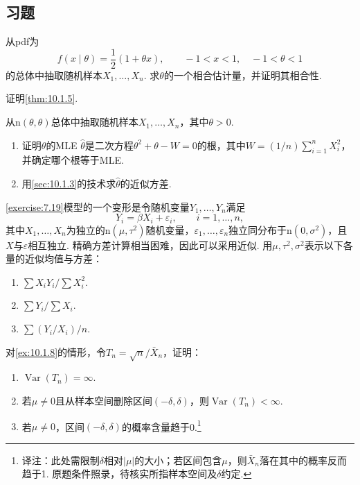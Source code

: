 \subsection{习题}\label{sec:10.5}

\begin{exercise}\label{exercise:10.1}
从pdf为
$$f(x\mid\theta)=\frac12(1+\theta x),\qquad-1<x<1,\quad-1<\theta<1$$
的总体中抽取随机样本$X_1,\ldots,X_n$. 求$\theta$的一个相合估计量，并证明其相合性.
\end{exercise}

\begin{exercise}\label{exercise:10.2}
证明\autoref{thm:10.1.5}.
\end{exercise}

\begin{exercise}\label{exercise:10.3}
从$\mathrm n(\theta,\theta)$总体中抽取随机样本$X_1,\ldots,X_n$，其中$\theta>0$.
\begin{enumerate}[label=(\alph*)]
\item 证明$\theta$的MLE $\hat\theta$是二次方程$\theta^2+\theta-W=0$的根，其中$W=(1/n)\sum_{i=1}^nX_i^2$，并确定哪个根等于MLE.
\item 用\autoref{sec:10.1.3}的技术求$\hat\theta$的近似方差.
\end{enumerate}
\end{exercise}

\begin{exercise}\label{exercise:10.4}
\autoref{exercise:7.19}模型的一个变形是令随机变量$Y_1,\ldots,Y_n$满足
$$Y_i=\beta X_i+\varepsilon_i,\qquad i=1,\ldots,n,$$
其中$X_1,\ldots,X_n$为独立的$\mathrm n(\mu,\tau^2)$随机变量，$\varepsilon_1,\ldots,\varepsilon_n$独立同分布于$\mathrm n(0,\sigma^2)$，且$X$与$\varepsilon$相互独立. 精确方差计算相当困难，因此可以采用近似. 用$\mu,\tau^2,\sigma^2$表示以下各量的近似均值与方差：
\begin{enumerate}[label=(\alph*)]
\item $\sum X_iY_i/\sum X_i^2$.
\item $\sum Y_i/\sum X_i$.
\item $\sum(Y_i/X_i)/n$.
\end{enumerate}
\end{exercise}

\begin{exercise}\label{exercise:10.5}
对\autoref{ex:10.1.8}的情形，令$T_n=\sqrt n/\bar X_n$，证明：
\begin{enumerate}[label=(\alph*)]
\item $\operatorname{Var}(T_n)=\infty$.
\item 若$\mu\ne0$且从样本空间删除区间$(-\delta,\delta)$，则$\operatorname{Var}(T_n)<\infty$.
\item 若$\mu\ne0$，区间$(-\delta,\delta)$的概率含量趋于0.\footnote{译注：此处需限制$\delta$相对$|\mu|$的大小；若区间包含$\mu$，则$\bar X_n$落在其中的概率反而趋于1. 原题条件照录，待核实所指样本空间及$\delta$约定.}
\end{enumerate}
\end{exercise}

